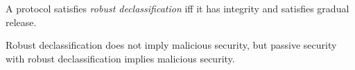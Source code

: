 \begin{definition}
  A protocol satisfies \emph{robust declassification} iff it has integrity and
  satisfies gradual release. 
\end{definition}

\begin{theorem}
  Robust declassification does not imply malicious security, but
  passive security with robust declassification implies malicious security.
\end{theorem}
